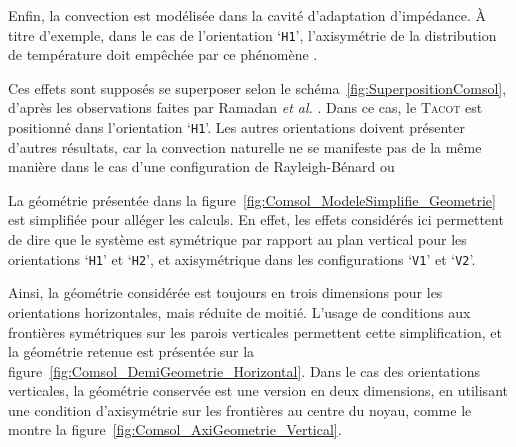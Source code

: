 Enfin, la convection est modélisée dans la cavité d'adaptation d'impédance. À titre d'exemple, dans le cas de l'orientation `\texttt{H1}', l'axisymétrie de la distribution de température doit empêchée par ce phénomène .\medskip

Ces effets sont supposés se superposer selon le schéma~\ref{fig:SuperpositionComsol}, d'après les observations faites par Ramadan \textit{et al.} \cite{ramadan_design_2021}. Dans ce cas, le \textsc{Tacot} est positionné dans l'orientation `\texttt{H1}'. Les autres orientations doivent présenter d'autres résultats, car la convection naturelle ne se manifeste pas de la même manière dans le cas d'une configuration de Rayleigh-Bénard ou 

\medskip
La géométrie présentée dans la figure~\ref{fig:Comsol_ModeleSimplifie_Geometrie} est simplifiée pour alléger les calculs. En effet, les effets considérés ici permettent de dire que le système est symétrique par rapport au plan vertical pour les orientations `\texttt{H1}' et `\texttt{H2}', et axisymétrique dans les configurations `\texttt{V1}' et `\texttt{V2}'. 

Ainsi, la géométrie considérée est toujours en trois dimensions pour les orientations horizontales, mais réduite de moitié. L'usage de conditions aux frontières symétriques sur les parois verticales permettent cette simplification, et la géométrie retenue est présentée sur la figure~\ref{fig:Comsol_DemiGeometrie_Horizontal}. Dans le cas des orientations verticales, la géométrie conservée est une version en deux dimensions, en utilisant une condition d'axisymétrie sur les frontières au centre du noyau, comme le montre la figure~\ref{fig:Comsol_AxiGeometrie_Vertical}.

\bigskip 

